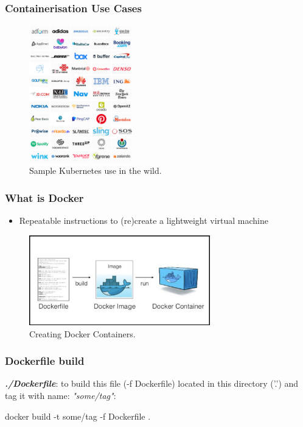 \documentclass{beamer}
\begin{document}
  \begin{frame}
    \frametitle{Containerisation Use Cases}
    \begin{figure}[th!]
      \centering
      \includegraphics[width=0.4\textwidth]{kube_case_studies.png}
      \caption{Sample Kubernetes use in the wild. \autocite{kube_cases}}
      \label{fig:kube_use}
    \end{figure}
  \end{frame}

  \begin{frame}
    \frametitle{What is Docker}
    \begin{itemize}
        \item Repeatable instructions to (re)create a lightweight virtual machine
    \end{itemize}
    \begin{figure}[th!]
      \centering
      \includegraphics[width=0.7\textwidth]{docker_process.png}
      \caption{Creating Docker Containers. \autocite{docker_build}}
      \label{fig:docker_build}
    \end{figure}
  \end{frame}

  \begin{frame}[fragile]
    \frametitle{Dockerfile build}
    \textbf{\textit{./Dockerfile}}:
    to build this file (-f Dockerfile) located in this directory ('.') and tag it with name: \textit{"some/tag"}:
    \begin{bashcode}
docker build -t some/tag -f Dockerfile .
    \end{bashcode}
  \end{frame}
\end{document}
